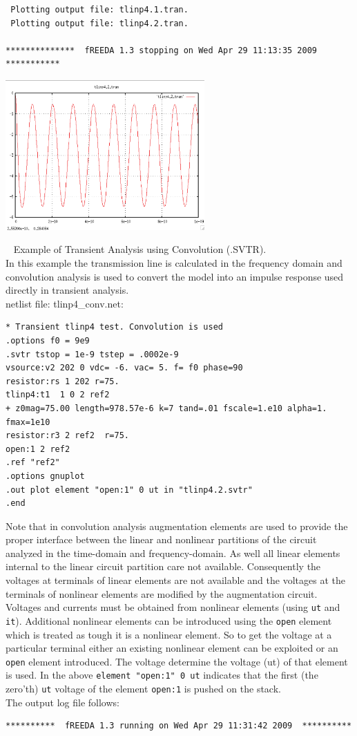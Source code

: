 \documentclass{article}
\begin{document}
{\begin{verbatim}
 Plotting output file: tlinp4.1.tran.
 Plotting output file: tlinp4.2.tran.

**************  fREEDA 1.3 stopping on Wed Apr 29 11:13:35 2009  ***********
\end{verbatim}


\centerline{\includegraphics[width=3in]{tlinp4.2.tran.eps}}
~
\myThickLine
Example of Transient Analysis using Convolution (.SVTR).\\
In this example the transmission line is calculated in the frequency domain and convolution analysis is used to convert the model into an impulse response used directly in transient analysis.\\
netlist file: tlinp4\_conv.net:
\begin{verbatim}
* Transient tlinp4 test. Convolution is used
.options f0 = 9e9
.svtr tstop = 1e-9 tstep = .0002e-9
vsource:v2 202 0 vdc= -6. vac= 5. f= f0 phase=90
resistor:rs 1 202 r=75.
tlinp4:t1  1 0 2 ref2
+ z0mag=75.00 length=978.57e-6 k=7 tand=.01 fscale=1.e10 alpha=1. fmax=1e10
resistor:r3 2 ref2  r=75.
open:1 2 ref2
.ref "ref2"
.options gnuplot
.out plot element "open:1" 0 ut in "tlinp4.2.svtr"
.end
\end{verbatim}
Note that in convolution analysis augmentation elements are used to provide the proper interface between the linear and nonlinear partitions of the circuit analyzed in the time-domain and frequency-domain. As well all linear elements internal to the linear circuit partition care not available. Consequently the voltages at terminals of linear elements are not available and the voltages at the terminals of nonlinear elements are modified by the augmentation circuit. Voltages and currents must be obtained from nonlinear elements (using \texttt{ut} and \texttt{it}). Additional nonlinear elements can be introduced using the \texttt{open} element which is treated as tough it is a nonlinear element.  So to get the voltage at a particular terminal either an existing nonlinear element can be exploited or an \texttt{open} element introduced. The voltage determine the voltage (ut) of that element is used.  In the above \texttt{element "open:1" 0 ut} indicates that the first (the zero'th) \texttt{ut} voltage of the element \texttt{open:1} is pushed on the stack.\\[0.1in]
The output log file follows:
\begin{verbatim}
**********  fREEDA 1.3 running on Wed Apr 29 11:31:42 2009  **********



\end{verbatim}}
\end{document}
